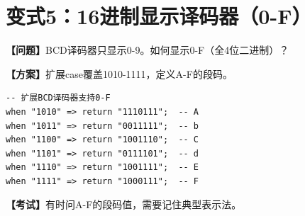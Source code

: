 \section{变式5：16进制显示译码器（0-F）}

\begin{detailbox}[完整教学]
\textbf{【问题】}BCD译码器只显示0-9。如何显示0-F（全4位二进制）？

\textbf{【方案】}扩展case覆盖1010-1111，定义A-F的段码。

\begin{lstlisting}
-- 扩展BCD译码器支持0-F
when "1010" => return "1110111";  -- A
when "1011" => return "0011111";  -- b
when "1100" => return "1001110";  -- C
when "1101" => return "0111101";  -- d
when "1110" => return "1001111";  -- E
when "1111" => return "1000111";  -- F
\end{lstlisting}

\textbf{【考试】}有时问A-F的段码值，需要记住典型表示法。
\end{detailbox}
